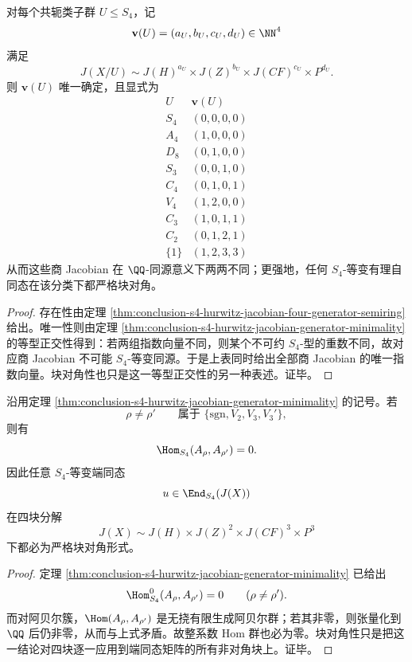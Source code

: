 \begin{corollary}\label{cor:conclusion-s4-hurwitz-jacobian-exponent-vectors}
对每个共轭类子群 \(U\le S_4\)，记
\[
\mathbf v(U)=(a_U,b_U,c_U,d_U)\in\NN^4
\]
满足
\[
J(X/U)\sim J(H)^{a_U}\times J(Z)^{b_U}\times J(CF)^{c_U}\times P^{d_U}.
\]
则 \(\mathbf v(U)\) 唯一确定，且显式为
\[
\begin{array}{c|c}
U & \mathbf v(U)\\\hline
S_4&(0,0,0,0)\\
A_4&(1,0,0,0)\\
D_8&(0,1,0,0)\\
S_3&(0,0,1,0)\\
C_4&(0,1,0,1)\\
V_4&(1,2,0,0)\\
C_3&(1,0,1,1)\\
C_2&(0,1,2,1)\\
\{1\}&(1,2,3,3)
\end{array}
\]
从而这些商 Jacobian 在 \(\QQ\)-同源意义下两两不同；更强地，任何 \(S_4\)-等变有理自同态在该分类下都严格块对角。
\end{corollary}
\begin{proof}
存在性由定理 \ref{thm:conclusion-s4-hurwitz-jacobian-four-generator-semiring} 给出。唯一性则由定理 \ref{thm:conclusion-s4-hurwitz-jacobian-generator-minimality} 的等型正交性得到：若两组指数向量不同，则某个不可约 \(S_4\)-型的重数不同，故对应商 Jacobian 不可能 \(S_4\)-等变同源。于是上表同时给出全部商 Jacobian 的唯一指数向量。块对角性也只是这一等型正交性的另一种表述。证毕。
\end{proof}

\begin{corollary}\label{cor:conclusion-s4-hurwitz-jacobian-integral-hom-orthogonality}
沿用定理 \ref{thm:conclusion-s4-hurwitz-jacobian-generator-minimality} 的记号。若
\[
\rho\neq \rho'
\qquad
\text{属于 }
\{\mathrm{sgn},V_2,V_3,V_3'\},
\]
则有
\[
\Hom_{S_4}(A_\rho,A_{\rho'})=0.
\]
因此任意 \(S_4\)-等变端同态
\[
u\in \End_{S_4}(J(X))
\]
在四块分解
\[
J(X)\sim J(H)\times J(Z)^2\times J(CF)^3\times P^3
\]
下都必为严格块对角形式。
\end{corollary}
\begin{proof}
定理 \ref{thm:conclusion-s4-hurwitz-jacobian-generator-minimality} 已给出
\[
\Hom_{S_4}^0(A_\rho,A_{\rho'})=0
\qquad(\rho\neq \rho').
\]
而对阿贝尔簇，\(\Hom(A_\rho,A_{\rho'})\) 是无挠有限生成阿贝尔群；若其非零，则张量化到 \(\QQ\) 后仍非零，从而与上式矛盾。故整系数 Hom 群也必为零。块对角性只是把这一结论对四块逐一应用到端同态矩阵的所有非对角块上。证毕。
\end{proof}


